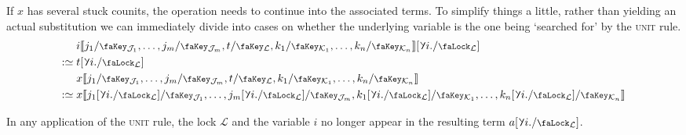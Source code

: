 \documentclass[10pt]{article}
\theoremstyle{definition}
\let\oldequiv\equiv%
\renewcommand{\equiv}{\simeq}
\newcommand{\defeq}{\oldequiv}
\newcommand{\rulen}[1]{\textsc{#1}}
\newcommand{\lock}{\mathchoice {\scalebox{0.8}{\text{\faLock}}}
  {\scalebox{0.8}{\text{\faLock}}} {\scalebox{0.5}{\text{\faLock}}}
  {\scalebox{0.4}{\text{\faLock}}} }
\newcommand{\key}{\mathchoice
  {\scalebox{0.8}{\text{\faKey}}} {\scalebox{0.8}{\text{\faKey}}}
  {\scalebox{0.5}{\text{\faKey}}} {\scalebox{0.4}{\text{\faKey}}} }
\newcommand{\rbindsym}{\raisebox{-0.5pt}{\scalerel*{\reflectbox{\rotatebox[origin=c]{185}{$\lambda$}}}{\lambda}}}
\newcommand{\lockn}[1]{\mathcal{#1}}
\newcommand{\varkeye}[2]{\key_{#1}^{#2}}
\newcommand{\varkey}[2]{\varkeye{\lockn{#1}}{#2}}
\newcommand{\admkeye}[2]{\overrightarrow{\key}_{#1}^{#2}}
\newcommand{\admkey}[2]{\admkeye{\lockn{#1}}{#2}}
\newcommand{\stubra}[1]{\llbracket #1 \rrbracket}
\newcommand{\admbra}[1]{[ #1 ]}
\newcommand{\subkeyoe}[2]{#1/\key_{#2}}
\newcommand{\subkeyo}[2]{\subkeyoe{#1}{\lockn{#2}}}
\newcommand{\subkeye}[2]{\admbra{\subkeyoe{#1}{#2}}}
\newcommand{\subkey}[2]{\admbra{\subkeyo{#1}{#2}}}
\newcommand{\sublock}[2]{\admbra{\rbindsym{} #2. /\lock_{\lockn{#1}} }}
\begin{document}
\begin{itemize}
  If $x$ has several stuck counits, the operation needs to continue
  into the associated terms. To simplify things a little, rather than
  yielding an actual substitution we can immediately divide into cases
  on whether the underlying variable is the one being `searched for'
  by the \rulen{unit} rule.
  \begin{align*}
    &i \stubra{\subkeyoe{j_1}{\lockn{J}_1}, \dots,
       \subkeyoe{j_{m}}{\lockn{J}_{m}},
       \subkeyo{t}{L},
      \subkeyoe{k_1}{\lockn{K}_{1}},
       \dots, \subkeyoe{k_n}{\lockn{K}_n}}\sublock{L}{i} \\
    :\defeq {}
    &t\sublock{L}{i} \\
    &x \stubra{\subkeyoe{j_1}{\lockn{J}_1}, \dots,
       \subkeyoe{j_{m}}{\lockn{J}_{m}},
       \subkeyo{t}{L},
      \subkeyoe{k_1}{\lockn{K}_{1}},
       \dots, \subkeyoe{k_n}{\lockn{K}_n}} \\
    :\defeq {}
    &x\stubra{\subkeyoe{j_1\sublock{L}{i}}{\lockn{J}_1}, \dots,
       \subkeyoe{j_{m}\sublock{L}{i}}{\lockn{J}_{m}},
      \subkeyoe{k_1\sublock{L}{i}}{\lockn{K}_{1}},
       \dots, \subkeyoe{k_n\sublock{L}{i}}{\lockn{K}_n}}
  \end{align*}


  In any application of the \rulen{unit} rule, the lock $\lockn{L}$
  and the variable $i$ no longer appear in the resulting term
  $a\sublock{L}{i}$.
\end{itemize}
\end{document}
